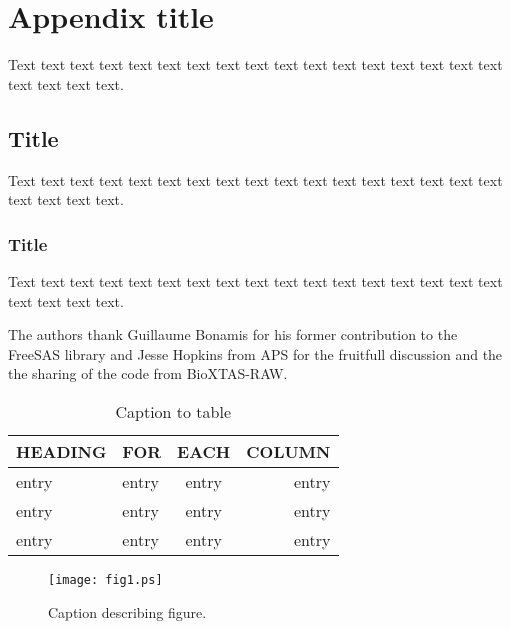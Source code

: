 \documentclass[preprint]{iucr}              %
\begin{document}
\appendix
\section{Appendix title}

Text text text text text text text text text text text text text text
text text text text text text text.

\subsection{Title}

Text text text text text text text text text text text text text text
text text text text text text text.

\subsubsection{Title}

Text text text text text text text text text text text text text text
text text text text text text text.




The authors thank Guillaume Bonamis for his former contribution to the FreeSAS library and Jesse Hopkins from APS for the fruitfull 
discussion and the the sharing of the code from BioXTAS-RAW.




\begin{table}
\caption{Caption to table}
\begin{tabular}{llcr}      %
 HEADING    & FOR        & EACH       & COLUMN     \\
\hline
 entry      & entry      & entry      & entry      \\
 entry      & entry      & entry      & entry      \\
 entry      & entry      & entry      & entry      \\
\end{tabular}
\end{table}


\begin{figure}
\caption{Caption describing figure.}
\texttt{[image: fig1.ps]}
\end{figure}



\end{document}
